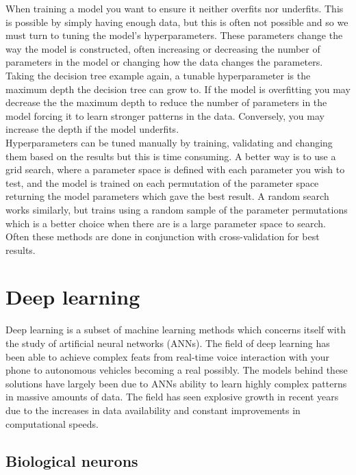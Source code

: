 \documentclass[
    author={Kai Hulme},
    supervisor={Dr Jon Bird},
    degree={BSc},
    title={Generative Adversarial Networks as an Augmentation Technique},
    subtitle={for Alzheimer's Disease Detection in MRI Volumes},
    type={Research},
    year={2021} 
]{dissertation}
\begin{document}
When training a model you want to ensure it neither overfits nor underfits. This is possible by simply having enough data, but this is often not possible and so we must turn to tuning the model's hyperparameters. These parameters change the way the model is constructed, often increasing or decreasing the number of parameters in the model or changing how the data changes the parameters. \\

Taking the decision tree example again, a tunable hyperparameter is the maximum depth the decision tree can grow to. If the model is overfitting you may decrease the the maximum depth to reduce the number of parameters in the model forcing it to learn stronger patterns in the data. Conversely, you may increase the depth if the model underfits. \\

Hyperparameters can be tuned manually by training, validating and changing them based on the results but this is time consuming. A better way is to use a grid search, where a parameter space is defined with each parameter you wish to test, and the model is trained on each permutation of the parameter space returning the model parameters which gave the best result. A random search works similarly, but trains using a random sample of the parameter permutations which is a better choice when there are is a large parameter space to search. Often these methods are done in conjunction with cross-validation for best results.

	
\section{Deep learning}

Deep learning is a subset of machine learning methods which concerns itself with the study of artificial neural networks (ANNs). The field of deep learning has been able to achieve complex feats from real-time voice interaction with your phone to autonomous vehicles becoming a real possibly. The models behind these solutions have largely been due to ANNs ability to learn highly complex patterns in massive amounts of data. The field has seen explosive growth in recent years due to the increases in data availability and constant improvements in computational speeds.
	
 \subsection{Biological neurons}
\end{document}
